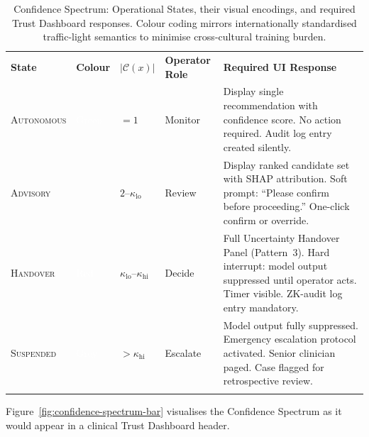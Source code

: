 \begin{table}[ht]
\centering
\caption{Confidence Spectrum: Operational States, their visual
  encodings, and required Trust Dashboard responses.
  Colour coding mirrors internationally standardised traffic-light
  semantics to minimise cross-cultural training burden.}
\label{tab:operational-states}
\small
\begin{tabular}{p{2.1cm}p{1.2cm}p{1.6cm}p{2.4cm}p{4.0cm}}
\hline\noalign{\smallskip}
\textbf{State}
  & \textbf{Colour}
  & \textbf{$|\mathcal{C}(x)|$}
  & \textbf{Operator Role}
  & \textbf{Required UI Response} \\
\noalign{\smallskip}\svhline\noalign{\smallskip}

\textsc{Autonomous}
  & \cellcolor{stategreen}\textcolor{white}{Green}
  & $= 1$
  & Monitor
  & Display single recommendation with confidence score.
    No action required. Audit log entry created silently. \\[4pt]

\textsc{Advisory}
  & \cellcolor{stateamber}{Amber}
  & $2$--$\kappa_{\mathrm{lo}}$
  & Review
  & Display ranked candidate set with SHAP attribution.
    Soft prompt: ``Please confirm before proceeding.''
    One-click confirm or override. \\[4pt]

\textsc{Handover}
  & \cellcolor{statered}\textcolor{white}{Red}
  & $\kappa_{\mathrm{lo}}$--$\kappa_{\mathrm{hi}}$
  & Decide
  & Full Uncertainty Handover Panel (Pattern~3).
    Hard interrupt: model output suppressed until operator
    acts. Timer visible. ZK-audit log entry mandatory. \\[4pt]

\textsc{Suspended}
  & \cellcolor{stategray}\textcolor{white}{Grey}
  & $> \kappa_{\mathrm{hi}}$
  & Escalate
  & Model output fully suppressed. Emergency escalation
    protocol activated. Senior clinician paged.
    Case flagged for retrospective review. \\

\noalign{\smallskip}\hline\noalign{\smallskip}
\end{tabular}
\end{table}

Figure~\ref{fig:confidence-spectrum-bar} visualises the
Confidence Spectrum as it would appear in a clinical Trust
Dashboard header.

